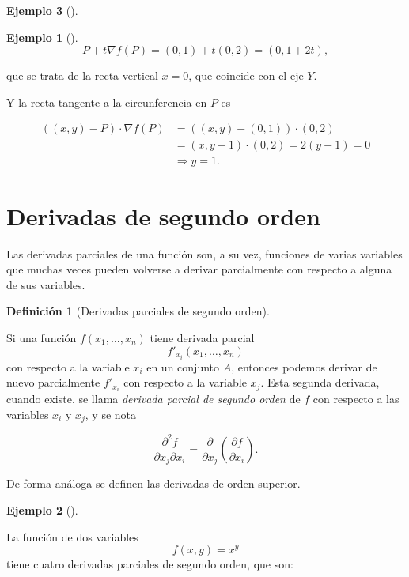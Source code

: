 \documentclass[
  a4paper,
]{scrreport}
\theoremstyle{definition}
\newtheorem{example}{Ejemplo}[chapter]
\theoremstyle{plain}
\theoremstyle{definition}
\newtheorem{definition}{Definición}[chapter]
\theoremstyle{definition}
\theoremstyle{plain}
\theoremstyle{plain}
\theoremstyle{remark}
\begin{document}
\begin{example}[]
\begin{example}[]
\[
P + t \nabla f(P) = (0,1) + t (0,2) = (0, 1+2t),
\]

que se trata de la recta vertical \(x=0\), que coincide con el eje
\(Y\).

Y la recta tangente a la circunferencia en \(P\) es

\begin{align*}
((x,y)-P)\cdot \nabla f(P) 
&= ((x,y)-(0,1))\cdot (0,2) \\
&= (x, y-1)\cdot(0, 2) 
= 2(y-1) 
= 0 \\
&\Rightarrow y=1.
\end{align*}

\end{example}

\section{Derivadas de segundo orden}\label{derivadas-de-segundo-orden}

Las derivadas parciales de una función son, a su vez, funciones de
varias variables que muchas veces pueden volverse a derivar parcialmente
con respecto a alguna de sus variables.

\begin{definition}[Derivadas parciales de segundo
orden]\protect\hypertarget{def-derivadas-segundo-orden}{}\label{def-derivadas-segundo-orden}

Si una función \(f(x_1,\ldots,x_n)\) tiene derivada parcial
\[f'_{x_i}(x_1,\ldots,x_n)\] con respecto a la variable \(x_i\) en un
conjunto \(A\), entonces podemos derivar de nuevo parcialmente
\(f'_{x_i}\) con respecto a la variable \(x_j\). Esta segunda derivada,
cuando existe, se llama \emph{derivada parcial de segundo orden} de
\(f\) con respecto a las variables \(x_i\) y \(x_j\), y se nota

\[\frac{\partial ^2 f}{\partial x_j \partial x_i}= \frac{\partial}{\partial x_j}\left(\frac{\partial f}{\partial x_i}\right).\]

\end{definition}

De forma análoga se definen las derivadas de orden superior.

\begin{example}[]\protect\hypertarget{exm-derivadas-segundo-orden}{}\label{exm-derivadas-segundo-orden}

La función de dos variables \[f(x,y)=x^y\] tiene cuatro derivadas
parciales de segundo orden, que son:


\end{example}
\end{example}
\end{document}
